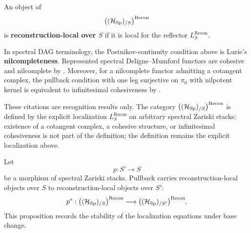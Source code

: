 \begin{definition}
\label{def:reconstruction-local-objects}
An object of
\[
    \bigl((\mathcal H_{\operatorname{Sp}})_{/S}\bigr)^{\mathrm{Recon}}
\]
is \textbf{reconstruction-local over \(S\)} if it is local for the reflector
\(L^{\mathrm{Recon}}_S\).
\end{definition}

\begin{remark}
\label{rem:reconstruction-local-recognition-dagxiv}
In spectral DAG terminology, the Postnikov-continuity
condition above is Lurie's \textbf{nilcompleteness}. Represented spectral
Deligne--Mumford functors are cohesive and nilcomplete by
\cite[Proposition~2.1.7]{LurieDAGXIV}. Moreover, for a nilcomplete functor
admitting a cotangent complex, the pullback condition with one leg surjective on \(\pi_0\) with nilpotent kernel is
equivalent to infinitesimal cohesiveness by
\cite[Proposition~2.1.13]{LurieDAGXIV}.

These citations are recognition results only. The category
\(\bigl((\mathcal H_{\operatorname{Sp}})_{/S}\bigr)^{\mathrm{Recon}}\) is defined by the explicit localization
\(L^{\mathrm{Recon}}_S\) on arbitrary spectral Zariski stacks; existence of a
cotangent complex, a cohesive structure, or infinitesimal cohesiveness is not
part of the definition; the definition remains the explicit localization above.
\end{remark}

\begin{proposition}
\label{prop:reconstruction-local-base-change}
Let
\[
    p:S'\longrightarrow S
\]
be a morphism of spectral Zariski stacks. Pullback carries
reconstruction-local objects over \(S\) to reconstruction-local objects over
\(S'\):
\[
    p^*:
    \bigl((\mathcal H_{\operatorname{Sp}})_{/S}\bigr)^{\mathrm{Recon}}
    \longrightarrow
    \bigl((\mathcal H_{\operatorname{Sp}})_{/S'}\bigr)^{\mathrm{Recon}}.
\]
This proposition records the stability of the localization equations under
base change.
\end{proposition}

